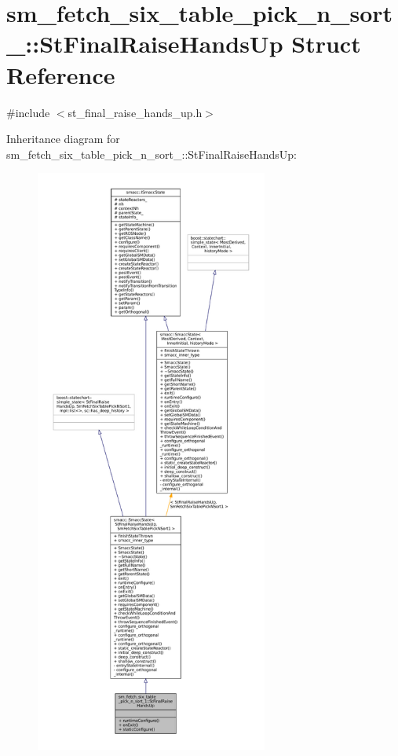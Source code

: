 \hypertarget{structsm__fetch__six__table__pick__n__sort__1_1_1StFinalRaiseHandsUp}{}\section{sm\+\_\+fetch\+\_\+six\+\_\+table\+\_\+pick\+\_\+n\+\_\+sort\+\_\+:\+:St\+Final\+Raise\+Hands\+Up Struct Reference}
\label{structsm__fetch__six__table__pick__n__sort__1_1_1StFinalRaiseHandsUp}


{\ttfamily \#include $<$st\+\_\+final\+\_\+raise\+\_\+hands\+\_\+up.\+h$>$}



Inheritance diagram for sm\+\_\+fetch\+\_\+six\+\_\+table\+\_\+pick\+\_\+n\+\_\+sort\+\_\+:\+:St\+Final\+Raise\+Hands\+Up\+:
\nopagebreak
\begin{figure}[H]
\begin{center}
\leavevmode
\includegraphics[height=550pt]{structsm__fetch__six__table__pick__n__sort__1_1_1StFinalRaiseHandsUp__inherit__graph}
\end{center}
\end{figure}


